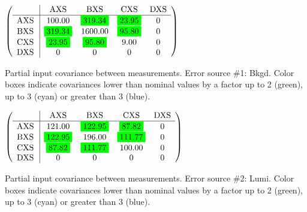 \begin{table}[H]
\scriptsize
\begin{center}
\renewcommand{\arraystretch}{1.1}
\begin{math}\left(\begin{array}{c|cccc}
 & \mathrm{AXS} & 
\mathrm{BXS} & 
\mathrm{CXS} & 
\mathrm{DXS} \\
\hline
\mathrm{AXS} \hspace*{2pt} &     100.00 &  \colorbox{Green1}{$    319.34$} &  \colorbox{Green1}{$     23.95$} &  0 \\
\mathrm{BXS} \hspace*{2pt} &  \colorbox{Green1}{$    319.34$} &    1600.00 &  \colorbox{Green1}{$     95.80$} &  0 \\
\mathrm{CXS} \hspace*{2pt} &  \colorbox{Green1}{$     23.95$} &  \colorbox{Green1}{$     95.80$} &       9.00 &  0 \\
\mathrm{DXS} \hspace*{2pt} &  0 &  0 &  0 &  0 \\
\end{array}\right)\end{math}
\caption{Partial input covariance between measurements. Error source \#1: Bkgd. Color boxes indicate covariances lower than nominal values by a factor up to 2 (green), up to 3 (cyan) or greater than 3 (blue).}
\renewcommand{\arraystretch}{1}
\end{center}
\end{table}
\begin{table}[H]
\scriptsize
\begin{center}
\renewcommand{\arraystretch}{1.1}
\begin{math}\left(\begin{array}{c|cccc}
 & \mathrm{AXS} & 
\mathrm{BXS} & 
\mathrm{CXS} & 
\mathrm{DXS} \\
\hline
\mathrm{AXS} \hspace*{2pt} &     121.00 &  \colorbox{Green1}{$    122.95$} &  \colorbox{Green1}{$     87.82$} &  0 \\
\mathrm{BXS} \hspace*{2pt} &  \colorbox{Green1}{$    122.95$} &     196.00 &  \colorbox{Green1}{$    111.77$} &  0 \\
\mathrm{CXS} \hspace*{2pt} &  \colorbox{Green1}{$     87.82$} &  \colorbox{Green1}{$    111.77$} &     100.00 &  0 \\
\mathrm{DXS} \hspace*{2pt} &  0 &  0 &  0 &  0 \\
\end{array}\right)\end{math}
\caption{Partial input covariance between measurements. Error source \#2: Lumi. Color boxes indicate covariances lower than nominal values by a factor up to 2 (green), up to 3 (cyan) or greater than 3 (blue).}
\renewcommand{\arraystretch}{1}
\end{center}
\end{table}
\clearpage
